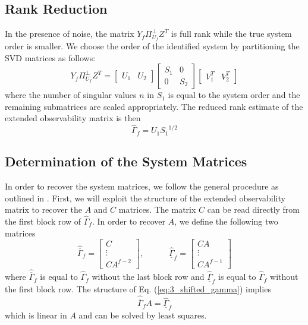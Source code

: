 \subsection{Rank Reduction}
In the presence of noise, the matrix $Y_f\Pi_{U_f}^\perp Z^T$ is full rank while the true system order is smaller. We choose the order of the identified system by partitioning the SVD matrices as follows:
\begin{equation*}
Y_f\Pi_{U_f}^\perp Z^T = 
\begin{bmatrix}U_1 & U_2\end{bmatrix}
\begin{bmatrix}S_1 & 0\\ 0 & S_2\end{bmatrix}
\begin{bmatrix}V_1^T & V_2^T\end{bmatrix}
\end{equation*}
where the number of singular values $n$ in $S_1$ is equal to the system order and the remaining submatrices are scaled appropriately. The reduced rank estimate of the extended observability matrix is then
\begin{equation}
\hat{\Gamma}_f = U_1 {S_1}^{1/2}
\end{equation}


\subsection{Determination of the System Matrices}
In order to recover the system matrices, we follow the general procedure as outlined in \cite{katayama2005subspace}. First, we will exploit the structure of the extended observability matrix to recover the $A$ and $C$ matrices. The matrix $C$ can be read directly from the first block row of $\hat{\Gamma}_f$. In order to recover $A$, we define the following two matrices 
\begin{equation}\label{eq:3_shifted_gamma}
\hat{\overline{\Gamma}}_f = \begin{bmatrix}C\\ \vdots \\ CA^{f-2}\end{bmatrix}, \hspace{3em}
\hat{\underline{\Gamma}}_f = \begin{bmatrix}CA\\ \vdots \\ CA^{f-1}\end{bmatrix}
\end{equation}
where $\hat{\overline{\Gamma}}_f$ is equal to $\hat{\Gamma}_f$ without the last block row and $\hat{\underline{\Gamma}}_f$ is equal to $\hat{\Gamma}_f$ without the first block row. The structure of Eq. (\ref{eq:3_shifted_gamma}) implies
\begin{equation}
\hat{\overline{\Gamma}}_f A = \hat{\underline{\Gamma}}_f
\end{equation}
which is linear in $A$ and can be solved by least squares.

